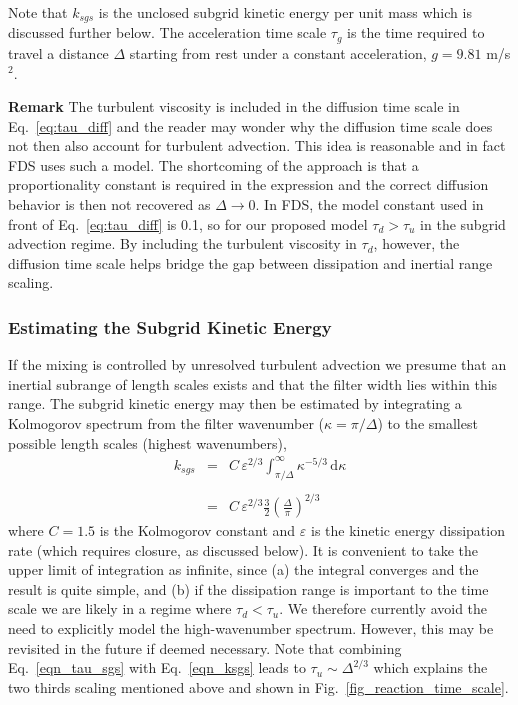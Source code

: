 Note that $k_{sgs}$ is the unclosed subgrid kinetic energy per unit mass which is discussed further below. The acceleration time scale $\tau_{g}$ is the time required to travel a distance $\Delta$ starting from rest under a constant acceleration, $g=9.81$ m/s$^2$.

{\bf Remark} The turbulent viscosity is included in the diffusion time scale in Eq.~\ref{eq:tau_diff} and the reader may wonder why the diffusion time scale does not then also account for turbulent advection.  This idea is reasonable and in fact FDS uses such a model.  The shortcoming of the approach is that a proportionality constant is required in the expression and the correct diffusion behavior is then not recovered as $\Delta \rightarrow 0$.  In FDS, the model constant used in front of Eq.~\ref{eq:tau_diff} is 0.1, so for our proposed model $\tau_d > \tau_u$ in the subgrid advection regime.  By including the turbulent viscosity in $\tau_d$, however, the diffusion time scale helps bridge the gap between dissipation and inertial range scaling.

\subsubsection{Estimating the Subgrid Kinetic Energy}

If the mixing is controlled by unresolved turbulent advection we presume that an inertial subrange of length scales exists and that the filter width lies within this range.  The subgrid kinetic energy may then be estimated by integrating a Kolmogorov spectrum \cite{Pope:2000} from the filter wavenumber ($\kappa = \pi/\Delta$) to the smallest possible length scales (highest wavenumbers),
\begin{equation}
\label{eqn_ksgs}
\begin{array}{rcl}
k_{sgs} &=& \displaystyle C \,\varepsilon^{2/3} \int_{\pi/\Delta}^{\infty} \kappa^{-5/3} \,\mbox{d} \kappa \\
\\
&=& \displaystyle C \,\varepsilon^{2/3} \frac{3}{2} \left(\frac{\Delta}{\pi}\right)^{2/3}
\end{array}
\end{equation}
where $C=1.5$ is the Kolmogorov constant \cite{Pope:2000} and $\varepsilon$ is the kinetic energy dissipation rate (which requires closure, as discussed below).  It is convenient to take the upper limit of integration as infinite, since (a) the integral converges and the result is quite simple, and (b) if the dissipation range is important to the time scale we are likely in a regime where $\tau_d < \tau_u$.  We therefore currently avoid the need to explicitly model the high-wavenumber spectrum.  However, this may be revisited in the future if deemed necessary.  Note that combining Eq.~\ref{eqn_tau_sgs} with Eq.~\ref{eqn_ksgs} leads to $\tau_u \sim \Delta^{2/3}$ which explains the two thirds scaling mentioned above and shown in Fig.~\ref{fig_reaction_time_scale}.

